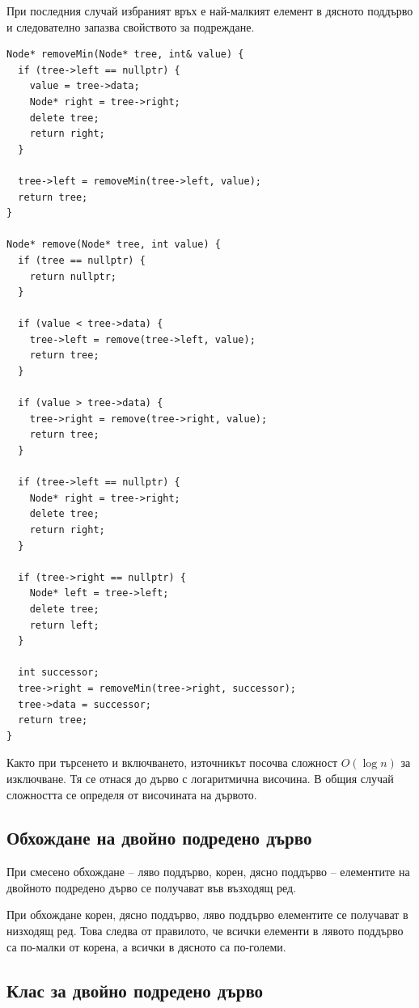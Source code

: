 При последния случай избраният връх е най-малкият елемент в дясното поддърво и следователно запазва свойството за подреждане.

\begin{verbatim}
Node* removeMin(Node* tree, int& value) {
  if (tree->left == nullptr) {
    value = tree->data;
    Node* right = tree->right;
    delete tree;
    return right;
  }

  tree->left = removeMin(tree->left, value);
  return tree;
}

Node* remove(Node* tree, int value) {
  if (tree == nullptr) {
    return nullptr;
  }

  if (value < tree->data) {
    tree->left = remove(tree->left, value);
    return tree;
  }

  if (value > tree->data) {
    tree->right = remove(tree->right, value);
    return tree;
  }

  if (tree->left == nullptr) {
    Node* right = tree->right;
    delete tree;
    return right;
  }

  if (tree->right == nullptr) {
    Node* left = tree->left;
    delete tree;
    return left;
  }

  int successor;
  tree->right = removeMin(tree->right, successor);
  tree->data = successor;
  return tree;
}
\end{verbatim}

Както при търсенето и включването, източникът посочва сложност $O(\log n)$ за изключване. Тя се отнася до дърво с логаритмична височина. В общия случай сложността се определя от височината на дървото.

\subsection{Обхождане на двойно подредено дърво}\label{s:18.7.4}

При смесено обхождане -- ляво поддърво, корен, дясно поддърво -- елементите на двойното подредено дърво се получават във възходящ ред.

При обхождане корен, дясно поддърво, ляво поддърво елементите се получават в низходящ ред. Това следва от правилото, че всички елементи в лявото поддърво са по-малки от корена, а всички в дясното са по-големи.


\subsection{Клас за двойно подредено дърво}\label{s:18.7.5}

